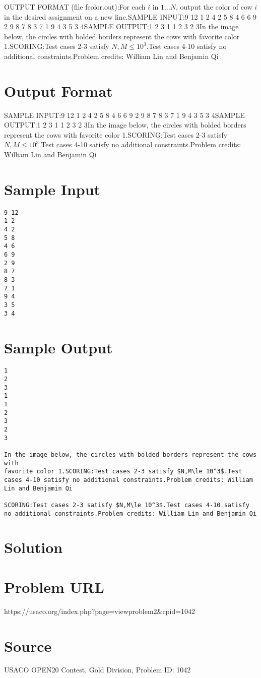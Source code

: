 \documentclass[12pt]{article}
\begin{document}
OUTPUT FORMAT (file fcolor.out):For each $i$ in $1\ldots N$, output the color of cow $i$ in the desired
assignment on a new line.SAMPLE INPUT:9 12
1 2
4 2
5 8
4 6
6 9
2 9
8 7
8 3
7 1
9 4
3 5
3 4SAMPLE OUTPUT:1
2
3
1
1
2
3
2
3In the image below, the circles with bolded borders represent the cows with 
favorite color 1.SCORING:Test cases 2-3 satisfy $N,M\le 10^3$.Test cases 4-10 satisfy no additional constraints.Problem credits: William Lin and Benjamin Qi

\section*{Output Format}
SAMPLE INPUT:9 12
1 2
4 2
5 8
4 6
6 9
2 9
8 7
8 3
7 1
9 4
3 5
3 4SAMPLE OUTPUT:1
2
3
1
1
2
3
2
3In the image below, the circles with bolded borders represent the cows with 
favorite color 1.SCORING:Test cases 2-3 satisfy $N,M\le 10^3$.Test cases 4-10 satisfy no additional constraints.Problem credits: William Lin and Benjamin Qi

\section*{Sample Input}
\begin{verbatim}
9 12
1 2
4 2
5 8
4 6
6 9
2 9
8 7
8 3
7 1
9 4
3 5
3 4
\end{verbatim}

\section*{Sample Output}
\begin{verbatim}
1
2
3
1
1
2
3
2
3

In the image below, the circles with bolded borders represent the cows with 
favorite color 1.SCORING:Test cases 2-3 satisfy $N,M\le 10^3$.Test cases 4-10 satisfy no additional constraints.Problem credits: William Lin and Benjamin Qi

SCORING:Test cases 2-3 satisfy $N,M\le 10^3$.Test cases 4-10 satisfy no additional constraints.Problem credits: William Lin and Benjamin Qi
\end{verbatim}

\section*{Solution}


\section*{Problem URL}
https://usaco.org/index.php?page=viewproblem2&cpid=1042

\section*{Source}
USACO OPEN20 Contest, Gold Division, Problem ID: 1042
\end{document}
